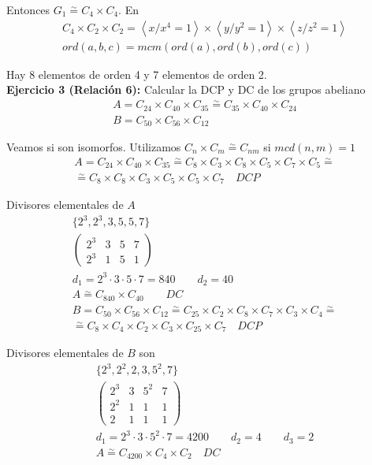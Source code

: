 \documentclass{article}
\begin{document}
Entonces $G_1\overset{\sim}{=}C_4\times C_4$. En 
\begin{gather*}
C_4\times C_2\times C_2=\left\langle x/x^4=1\right\rangle\times \left\langle y/y^2=1\right\rangle\times \left\langle z/z^2=1\right\rangle\\
ord(a,b,c)=mcm(ord(a),ord(b),ord(c))
\end{gather*}

Hay 8 elementos de orden 4 y 7 elementos de orden 2. \\

\textbf{Ejercicio 3 (Relación 6):} Calcular la DCP y DC de los grupos abeliano
\begin{gather*}
A=C_{24}\times C_{40}\times C_{35}\overset{\sim}{=}C_{35}\times C_{40}\times C_{24} \\
B=C_{50}\times C_{56}\times C_{12}
\end{gather*}

Veamos si son isomorfos. Utilizamos $C_n\times C_m\overset{\sim}{=}C_{nm}$ si $mcd(n,m)=1$
\begin{gather*}
A=C_{24}\times C_{40}\times C_{35}\overset{\sim}{=}C_8\times C_3\times C_8\times C_5\times C_7\times C_5\overset{\sim}{=}\\
\overset{\sim}{=}C_8\times C_8\times C_3\times C_5\times C_5\times C_7 \quad DCP
\end{gather*}

Divisores elementales de $A$
\begin{gather*}
\{2^3,2^3,3,5,5,7\}\\
\begin{pmatrix}
2^3&3&5&7\\
2^3&1&5&1
\end{pmatrix}\\
d_1=2^3\cdot 3\cdot 5\cdot 7=840\qquad d_2=40 \\
A\overset{\sim}{=} C_{840}\times C_{40}\qquad DC\\
B=C_{50}\times C_{56}\times C_{12}\overset{\sim}{=}C_{25}\times C_2\times C_8\times C_7\times C_3\times C_4\overset{\sim}{=}\\
\overset{\sim}{=} C_8\times C_4\times C_2\times C_3\times C_{25}\times C_7\quad DCP
\end{gather*}

Divisores elementales de $B$ son
\begin{gather*}
\{2^3,2^2,2,3,5^2,7\}\\
\begin{pmatrix}
2^3&3&5^2&7\\
2^2&1&1&1\\
2&1&1&1
\end{pmatrix}\\
d_1=2^3\cdot 3\cdot 5^2\cdot 7=4200 \qquad d_2=4\qquad d_3=2 \\
A\overset{\sim}{=} C_{4200}\times C_4\times C_2\quad DC
\end{gather*}
\end{document}
